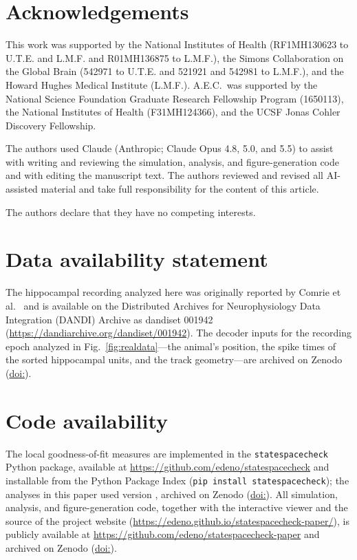 \documentclass[12pt]{article}
\begin{document}
\section*{Acknowledgements}
This work was supported by the National Institutes of Health (RF1MH130623 to U.T.E. and L.M.F. and R01MH136875 to L.M.F.), the Simons Collaboration on the Global Brain (542971 to U.T.E. and 521921 and 542981 to L.M.F.), and the Howard Hughes Medical Institute (L.M.F.). A.E.C.\ was supported by the National Science Foundation Graduate Research Fellowship Program (1650113), the National Institutes of Health (F31MH124366), and the UCSF Jonas Cohler Discovery Fellowship.

The authors used Claude (Anthropic; Claude Opus 4.8, 5.0, and 5.5) to assist with writing and reviewing the simulation, analysis, and figure-generation code and with editing the manuscript text. The authors reviewed and revised all AI-assisted material and take full responsibility for the content of this article.

The authors declare that they have no competing interests.

\section*{Data availability statement}
The hippocampal recording analyzed here was originally reported by Comrie et al.~\cite{ComrieHippocampalrepresentationsalternative2026} and is available on the Distributed Archives for Neurophysiology Data Integration (DANDI) Archive as dandiset 001942 (\url{https://dandiarchive.org/dandiset/001942}). The decoder inputs for the recording epoch analyzed in Fig.~\ref{fig:realdata}---the animal's position, the spike times of the sorted hippocampal units, and the track geometry---are archived on Zenodo (\href{https://doi.org/\RecordingInputsDOI}{doi:\RecordingInputsDOI}).

\section*{Code availability}\label{sec:code}
The local goodness-of-fit measures are implemented in the \texttt{statespacecheck} Python package, available at \url{https://github.com/edeno/statespacecheck} and installable from the Python Package Index (\texttt{pip install statespacecheck}); the analyses in this paper used version \texttt{\StatespacecheckVersion}, archived on Zenodo (\href{https://doi.org/\StatespacecheckDOI}{doi:\StatespacecheckDOI}). All simulation, analysis, and figure-generation code, together with the interactive viewer and the source of the project website (\url{https://edeno.github.io/statespacecheck-paper/}), is publicly available at \url{https://github.com/edeno/statespacecheck-paper} and archived on Zenodo (\href{https://doi.org/\AnalysisCodeDOI}{doi:\AnalysisCodeDOI}).
\end{document}

